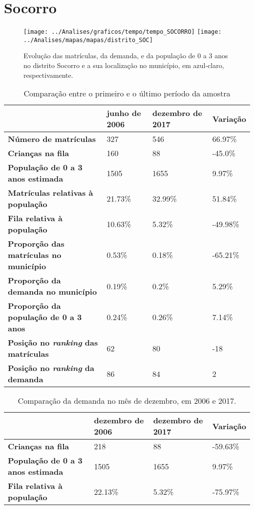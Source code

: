 \section{Socorro}
\begin{figure}[H]
\centering
\texttt{[image: ../Analises/graficos/tempo/tempo\_SOCORRO]}
\texttt{[image: ../Analises/mapas/mapas/distrito\_SOC]}
\caption{Evolução das matrículas, da demanda, e da população de 0 a 3 anos no distrito Socorro e a sua localização no município, em azul-claro, respectivamente.}
\end{figure}
\begin{table}[H]
\begin{tabular}{l|l|l|l}
\textbf{}                                      & \textbf{junho de 2006}       & \textbf{dezembro de 2017}    & \textbf{Variação} \\ \hline
\textbf{Número de matrículas}                  & 327 & 546 & 66.97\% \\ \hline
\textbf{Crianças na fila}                      & 160 & 88 & -45.0\% \\ \hline
\textbf{População de 0 a 3 anos estimada}      & 1505 & 1655 & 9.97\% \\ \hline
\textbf{Matrículas relativas à população}      & 21.73\% & 32.99\% & 51.84\% \\ \hline
\textbf{Fila relativa à população}             & 10.63\% & 5.32\% & -49.98\% \\ \hline
\textbf{Proporção das matrículas no município} & 0.53\% & 0.18\% & -65.21\% \\ \hline
\textbf{Proporção da demanda no município}     & 0.19\% & 0.2\% & 5.29\% \\ \hline
\textbf{Proporção da população de 0 a 3 anos}  & 0.24\% & 0.26\% & 7.14\% \\ \hline
\textbf{Posição no \textit{ranking} das matrículas}     & 62 & 80 & -18 \\ \hline
\textbf{Posição no \textit{ranking} da demanda}         & 86 & 84 & 2 \\ 
\end{tabular}
\caption{Comparação entre o primeiro e o último período da amostra}
\end{table}
\begin{table}[H]
\begin{tabular}{l|l|l|l}
\textbf{}                                 & \textbf{dezembro de 2006} & \textbf{dezembro de 2017} & \textbf{Variação} \\ \hline
\textbf{Crianças na fila}                      & 218 & 88 & -59.63\% \\ \hline
\textbf{População de 0 a 3 anos estimada}      & 1505 & 1655 & 9.97\% \\ \hline
\textbf{Fila relativa à população}             & 22.13\% & 5.32\% & -75.97\% \\
\end{tabular}
\caption{Comparação da demanda no mês de dezembro, em 2006 e 2017.}
\end{table}
